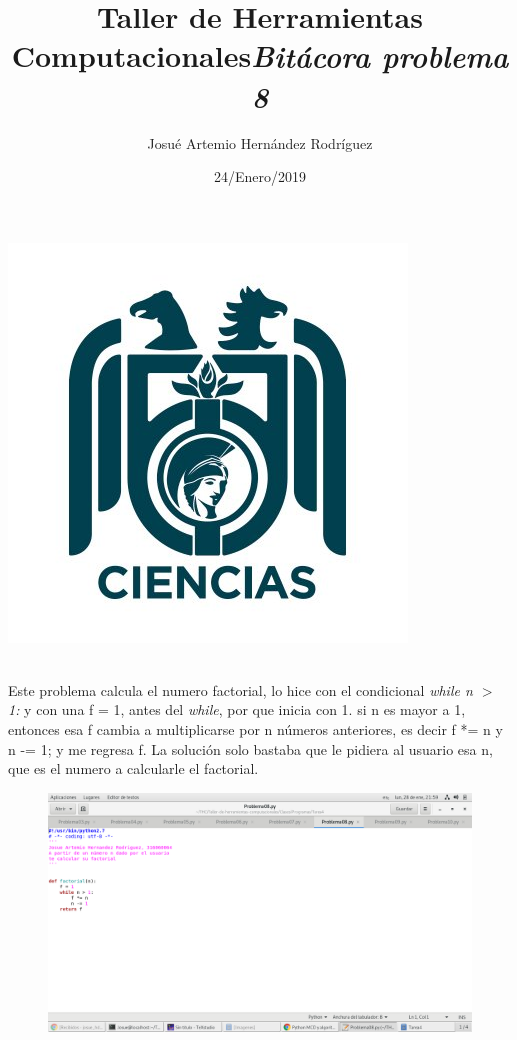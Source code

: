 \label{key}\documentclass[letterpaper, 12pt,oneside]{article}
\title{\Huge Taller de Herramientas Computacionales}
\author{Josué Artemio Hernández Rodríguez}
\date{24/Enero/2019}
\begin{document}
	\maketitle
	\begin{center}
		\includegraphics[scale=0.7]{3.jpg}
	\end{center}

	\newpage
	
	\title{\huge \textit{Bitácora problema 8 }}\\

	Este problema calcula el numero factorial, lo hice con el condicional \textit{while n $>$ 1:} y con una f = 1, antes del \textit{while}, por que inicia con 1. si n es mayor a 1, entonces esa f cambia a multiplicarse por n números anteriores, es decir f *= n y n -= 1; y me regresa f.  La solución solo bastaba que le pidiera al usuario esa n, que es el numero a calcularle el factorial. 
	  
	 

	\begin{figure}[h]
		\includegraphics[scale=0.4]{pro08.png}
		
	\end{figure}

	
	
\end{document}
